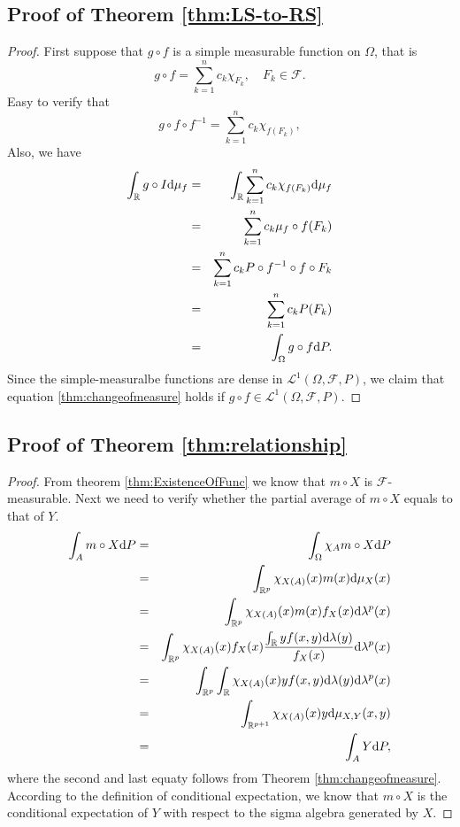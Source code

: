 \subsection{Proof of Theorem \ref{thm:LS-to-RS}}
\begin{proof}
First suppose that $g \circ f$ is a simple measurable function on $\Omega$, that is 
$$
g \circ f = \sum_{k=1}^{n}c_k \chi_{F_k}, \quad F_k \in \mathcal{F}.
$$
Easy to verify that 
$$
g \circ f \circ f^{-1} = \sum_{k=1}^n c_k \chi_{f(F_k)}, 
$$
Also, we have
\begin{eqnarray*}
	\int_{\mathbb{R}} g \circ I \mathrm{d} \mu_f &=&  \int_{\mathbb{R}} \sum_{k=1}^n c_k \chi_{f(F_k)} \mathrm{d} \mu_f \\
	&=&\sum_{k=1}^n c_k \mu_f \circ f(F_k) \\
	&=& \sum_{k=1}^n c_k P \circ f^{-1} \circ f \circ F_k \\
	&=& \sum_{k=1}^n c_k P(F_k) \\
	&=& \int_{\Omega} g \circ f \mathrm{d} P.
\end{eqnarray*}
Since the simple-measuralbe functions are dense in $\mathcal{L}^1(\Omega,\mathcal{F},P)$, we claim that equation \ref{thm:changeofmeasure} holds if $ g \circ f \in \mathcal{L}^1(\Omega,\mathcal{F},P).$
\end{proof}


\subsection{Proof of Theorem \ref{thm:relationship}}
\begin{proof}
From theorem \ref{thm:ExistenceOfFunc} we know that $m \circ X$ is $\mathcal{F}$-measurable. Next we need to verify whether the partial average of $m \circ X$ equals to that of $Y$.
\begin{eqnarray*}
	\int_A m \circ X \mathrm{d} P &=& \int_\Omega \chi_A m \circ X \mathrm{d} P \\
	&=& \int_{\mathbb{R}^p} \chi_{X(A)}(x) m(x) \mathrm{d} \mu_X(x) \\
	&=& \int_{\mathbb{R}^p} \chi_{X(A)}(x) m(x) f_X(x) \mathrm{d} \lambda^p (x) \\
	&=& \int_{\mathbb{R}^p} \chi_{X(A)}(x)f_X(x) \frac{\int_{\mathbb{R}} yf(x,y) \mathrm{d} \lambda(y)}{f_X(x)}\mathrm{d} \lambda^p(x) \\
	&=& \int_{\mathbb{R}^p}\int_{\mathbb{R}} \chi_{X(A)}(x) y f(x,y) \mathrm{d} \lambda(y) \mathrm{d} \lambda^p(x) \\
	&=& \int_{\mathbb{R}^{p+1}} \chi_{X(A)}(x) y \mathrm{d} \mu_{X,Y}(x,y) \\
	&=& \int_A Y \mathrm{d} P,
\end{eqnarray*}
where the second and last equaty follows from Theorem \ref{thm:changeofmeasure}.
According to the definition of conditional expectation, we know that $m \circ X$ is the conditional expectation of $Y$ with respect to the sigma algebra generated by $X$.
\end{proof}






